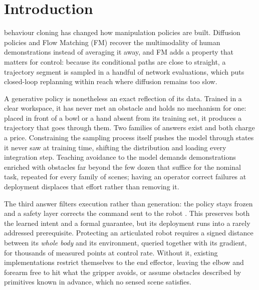 \documentclass[journal]{IEEEtran}
\begin{document}
\section{Introduction}
 behaviour cloning has changed how manipulation policies are built. Diffusion policies \cite{ChiXXXXVisuomotor} and Flow Matching (FM) \cite{Lipman2023Flow,Liu2023Rectified} recover the multimodality of human demonstrations instead of averaging it away, and FM adds a property that matters for control: because its conditional paths are close to straight, a trajectory segment is sampled in a handful of network evaluations, which puts closed-loop replanning within reach where diffusion remains too slow.

A generative policy is nonetheless an exact reflection of its data. Trained in a clear workspace, it has never met an obstacle and holds no mechanism for one: placed in front of a bowl or a hand absent from its training set, it produces a trajectory that goes through them. Two families of answers exist and both charge a price. Constraining the sampling process itself \cite{Dai2025Safeflow} pushes the model through states it never saw at training time, shifting the distribution and loading every integration step. Teaching avoidance to the model demands demonstrations enriched with obstacles far beyond the few dozen that suffice for the nominal task, repeated for every family of scenes; having an operator correct failures at deployment \cite{Welte2026Flowcorrect} displaces that effort rather than removing it.

The third answer filters execution rather than generation: the policy stays frozen and a safety layer corrects the command sent to the robot \cite{Rmer2026From,Wabersich2021Predictive}. This preserves both the learned intent and a formal guarantee, but its deployment runs into a rarely addressed prerequisite. Protecting an articulated robot requires a signed distance between its \emph{whole body} and its environment, queried together with its gradient, for thousands of measured points at control rate. Without it, existing implementations restrict themselves to the end effector, leaving the elbow and forearm free to hit what the gripper avoids, or assume obstacles described by primitives known in advance, which no sensed scene satisfies.
\end{document}
